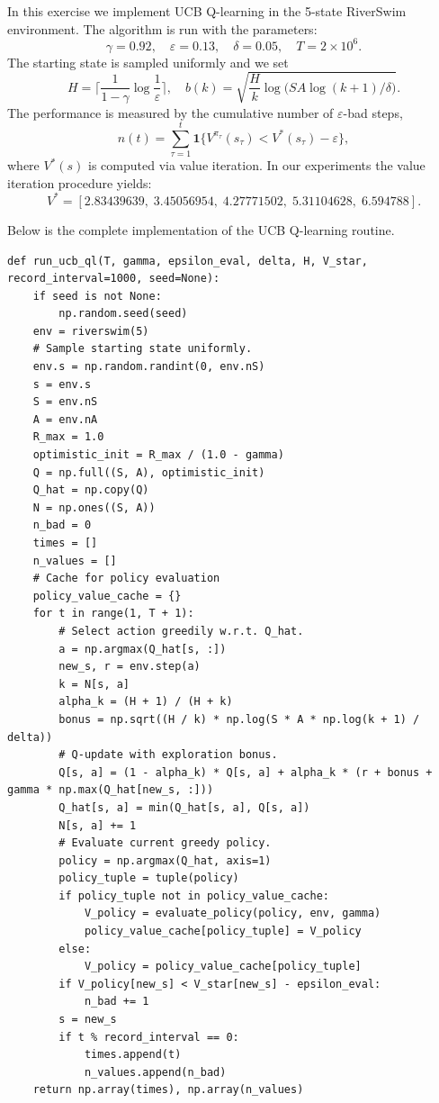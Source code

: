 In this exercise we implement UCB Q-learning in the 5-state RiverSwim environment. The algorithm is run with the parameters:
\[
\gamma = 0.92,\quad \varepsilon = 0.13,\quad \delta = 0.05,\quad T = 2\times10^6.
\]
The starting state is sampled uniformly and we set 
\[
H = \Big\lceil\frac{1}{1-\gamma}\log\frac{1}{\varepsilon}\Big\rceil,\quad b(k) = \sqrt{\frac{H}{k}\log\Big(SA\log(k+1)/\delta\Big)}.
\]
The performance is measured by the cumulative number of $\varepsilon$-bad steps,
\[
n(t)=\sum_{\tau=1}^{t}\mathbf{1}\{V^{\pi_\tau}(s_\tau) < V^*(s_\tau)-\varepsilon\},
\]
where $V^*(s)$ is computed via value iteration. In our experiments the value iteration procedure yields:
\[
V^* = [2.83439639,\; 3.45056954,\; 4.27771502,\; 5.31104628,\; 6.594788].
\]

Below is the complete implementation of the UCB Q-learning routine.

\begin{lstlisting}[caption={Complete UCB Q-learning routine}, label=lst:ucbql]
def run_ucb_ql(T, gamma, epsilon_eval, delta, H, V_star, record_interval=1000, seed=None):
    if seed is not None:
        np.random.seed(seed)
    env = riverswim(5)
    # Sample starting state uniformly.
    env.s = np.random.randint(0, env.nS)
    s = env.s
    S = env.nS
    A = env.nA
    R_max = 1.0
    optimistic_init = R_max / (1.0 - gamma)
    Q = np.full((S, A), optimistic_init)
    Q_hat = np.copy(Q)
    N = np.ones((S, A))
    n_bad = 0
    times = []
    n_values = []
    # Cache for policy evaluation
    policy_value_cache = {}
    for t in range(1, T + 1):
        # Select action greedily w.r.t. Q_hat.
        a = np.argmax(Q_hat[s, :])
        new_s, r = env.step(a)
        k = N[s, a]
        alpha_k = (H + 1) / (H + k)
        bonus = np.sqrt((H / k) * np.log(S * A * np.log(k + 1) / delta))
        # Q-update with exploration bonus.
        Q[s, a] = (1 - alpha_k) * Q[s, a] + alpha_k * (r + bonus + gamma * np.max(Q_hat[new_s, :]))
        Q_hat[s, a] = min(Q_hat[s, a], Q[s, a])
        N[s, a] += 1
        # Evaluate current greedy policy.
        policy = np.argmax(Q_hat, axis=1)
        policy_tuple = tuple(policy)
        if policy_tuple not in policy_value_cache:
            V_policy = evaluate_policy(policy, env, gamma)
            policy_value_cache[policy_tuple] = V_policy
        else:
            V_policy = policy_value_cache[policy_tuple]
        if V_policy[new_s] < V_star[new_s] - epsilon_eval:
            n_bad += 1
        s = new_s
        if t % record_interval == 0:
            times.append(t)
            n_values.append(n_bad)
    return np.array(times), np.array(n_values)
\end{lstlisting}

